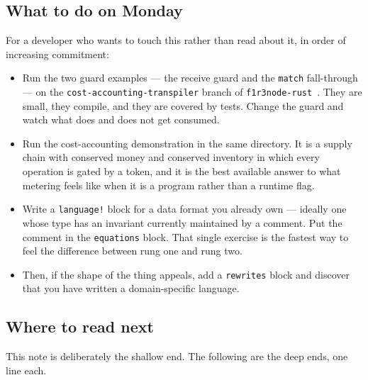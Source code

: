 \subsection{What to do on Monday}

For a developer who wants to touch this rather than read about it, in order of
increasing commitment:

\begin{itemize}[leftmargin=1.6em,itemsep=3pt]
\item Run the two guard examples --- the receive guard and the \texttt{match}
  fall-through --- on the \texttt{cost-accounting-transpiler} branch of
  \texttt{f1r3node-rust}~\cite{f1r3node}. They are small, they compile, and they are covered by
  tests. Change the guard and watch what does and does not get consumed.
\item Run the cost-accounting demonstration in the same directory. It is a
  supply chain with conserved money and conserved inventory in which every
  operation is gated by a token, and it is the best available answer to what
  metering feels like when it is a program rather than a runtime flag.
\item Write a \texttt{language!} block for a data format you already own ---
  ideally one whose type has an invariant currently maintained by a comment. Put
  the comment in the \texttt{equations} block. That single exercise is the
  fastest way to feel the difference between rung one and rung two.
\item Then, if the shape of the thing appeals, add a \texttt{rewrites} block and
  discover that you have written a domain-specific language.
\end{itemize}

\subsection{Where to read next}

This note is deliberately the shallow end. The following are the deep ends, one
line each.

